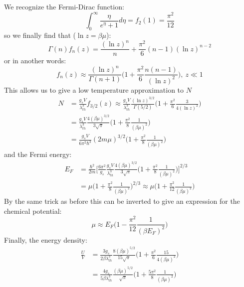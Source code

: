 \documentclass[a4paper,11pt,oneside]{book}
\begin{document}
We recognize the Fermi-Dirac function:
\begin{equation}
    \int_{0}^\infty \frac{\eta}{e^{\eta}+1}d\eta =f_2(1) = \frac{\pi^2}{12}
\end{equation}
so we finally find that ($\ln z = \beta \mu$):
\begin{equation}
      \Gamma(n) f_n(z) = \frac{(\ln z)^n}{n}+ \frac{\pi^2}{6}(n-1)(\ln z)^{n-2}
\end{equation}
or in another words:
\begin{equation}
    \boxed{f_n(z) \approx \frac{(\ln z)^n}{\Gamma(n+1)}\bigg(1+\frac{\pi^2}{6}\frac{n(n-1)}{(\ln z)^2}\bigg), \ z\ll 1}
\end{equation}
This allows us to give a low temperature approximation to $N$
\begin{align}
    N &= \frac{g_sV}{\lambda_{th}^3}f_{3/2}(z) \approx \frac{g_sV}{\lambda_{th}^3}\frac{(\ln z)^{3/2}}{\Gamma(5/2)}\bigg(1+\frac{\pi^2}{6}\frac{3}{4(\ln z)^2}\bigg)\\
    &=\frac{g_sV}{\lambda_{th}^3}\frac{4(\beta\mu)^{3/2}}{3\sqrt{\pi}}\bigg(1+\frac{\pi^2}{8}\frac{1}{(\beta \mu)^2}\bigg)\\
    &=\frac{g_sV}{6\pi^2 \hbar^3}(2m\mu)^{3/2}\bigg(1+\frac{\pi^2}{8}\frac{1}{(\beta \mu)^2}\bigg)
\end{align}
and the Fermi energy:
\begin{align}
    E_F &= \frac{\hbar^2}{2m}\bigg[\frac{6\pi^2}{g_s}\frac{g_sV}{\lambda_{th}^3}\frac{4(\beta\mu)^{3/2}}{3\sqrt{\pi}}\bigg(1+\frac{\pi^2}{8}\frac{1}{(\beta \mu)^2}\bigg)\bigg]^{2/3}\\
    &=\mu \bigg(1+\frac{\pi^2}{8}\frac{1}{(\beta \mu)^2}\bigg)^{2/3}\approx \mu \bigg(1+\frac{\pi^2}{12}\frac{1}{(\beta \mu)^2}\bigg)
\end{align}
By the same trick as before this can be inverted to give an expression for the chemical potential:
\begin{equation}\label{mu approx}
    \mu \approx E_F\bigg(1-\frac{\pi^2}{12}\frac{1}{(\beta E_F)^2}\bigg)
\end{equation}
Finally, the energy density:
\begin{align}
    \frac{U}{V} &= \frac{3g_s}{2\beta \lambda_{th}^3} \frac{8(\beta \mu)^{5/2}}{15\sqrt{\pi}}\bigg(1+\frac{\pi^2}{6}\frac{15}{4(\beta \mu)^2}\bigg)\\
    &=\frac{4g_s}{5\beta \lambda_{th}^3} \frac{(\beta \mu)^{5/2}}{\sqrt{\pi}}\bigg(1+\frac{5\pi^2}{8}\frac{1}{(\beta \mu)^2}\bigg)
\end{align}
\end{document}
